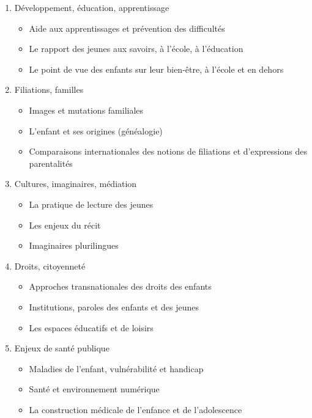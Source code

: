 \begin{enumerate}
    \item Développement, éducation, apprentissage
    \begin{itemize}
        \item Aide aux apprentissages et prévention des difficultés
        \item Le rapport des jeunes aux savoirs, à l'école, à l'éducation
        \item Le point de vue des enfants sur leur bien-être, à l'école et en dehors
    \end{itemize}    
    \item Filiations, familles
    \begin{itemize}
        \item Images et mutations familiales  
        \item L'enfant et ses origines (généalogie)
        \item Comparaisons internationales des notions de filiations et d'expressions des parentalités
    \end{itemize}
    \item Cultures, imaginaires, médiation
    \begin{itemize}
        \item La pratique de lecture des jeunes  
        \item Les enjeux du récit
        \item Imaginaires plurilingues
    \end{itemize}
    \item Droits, citoyenneté
    \begin{itemize}
        \item Approches transnationales des droits des enfants 
        \item Institutions, paroles des enfants et des jeunes
        \item Les espaces éducatifs et de loisirs
    \end{itemize}
    \item Enjeux de santé publique
    \begin{itemize}
        \item Maladies de l’enfant, vulnérabilité et handicap  
        \item Santé et environnement numérique
        \item La construction médicale de l'enfance et de l’adolescence
    \end{itemize}
\end{enumerate}